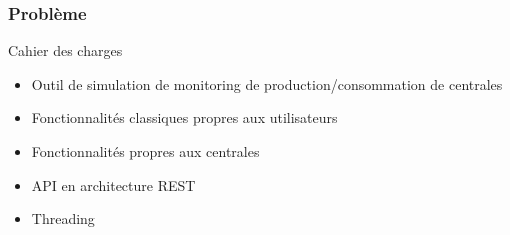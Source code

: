 
\begin{frame}
\frametitle{Problème}
  \begin{block}{Cahier des charges}
    \begin{itemize}
     \item Outil de simulation de monitoring de production/consommation de centrales
     \item Fonctionnalités classiques propres aux utilisateurs
     \item Fonctionnalités propres aux centrales 
     \item API en architecture REST
     \item Threading
    \end{itemize}    
  \end{block}
\end{frame}
